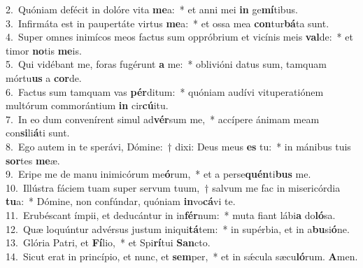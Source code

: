 {2.~}Quóniam defécit in dolóre vita \textbf{me}a:~* et anni mei \textbf{in} ge\textbf{mí}tibus.\\
{3.~}Infirmáta est in paupertáte virtus \textbf{me}a:~* et ossa mea \textbf{con}tur\textbf{bá}ta sunt.\\
{4.~}Super omnes inimícos meos factus sum oppróbrium et vicínis meis \textbf{val}de:~* et timor \textbf{no}tis \textbf{me}is.\\
{5.~}Qui vidébant me, foras fugérunt \textbf{a} me:~* oblivióni datus sum, tamquam mórtu\textbf{us} a \textbf{cor}de.\\
{6.~}Factus sum tamquam vas \textbf{pér}ditum:~* quóniam audívi vituperatiónem multórum commorántium \textbf{in} cir\textbf{cú}itu.\\
{7.~}In eo dum convenírent simul ad\textbf{vér}sum me,~* accípere ánimam meam con\textbf{si}li\textbf{á}ti sunt.\\
{8.~}Ego autem in te sperávi, Dómine:~† dixi: Deus meus \textbf{es} tu:~* in mánibus tuis \textbf{sor}tes \textbf{me}æ.\\
{9.~}Eripe me de manu inimicórum me\textbf{ó}rum,~* et a perse\textbf{quén}ti\textbf{bus} me.\\
{10.~}Illústra fáciem tuam super servum tuum,~† salvum me fac in misericórdia \textbf{tu}a:~* Dómine, non confúndar, quóniam \textbf{in}vo\textbf{cá}vi te.\\
{11.~}Erubéscant ímpii, et deducántur in in\textbf{fér}num:~* muta fiant lábi\textbf{a} do\textbf{ló}sa.\\
{12.~}Quæ loquúntur advérsus justum iniqui\textbf{tá}tem:~* in supérbia, et in a\textbf{bu}si\textbf{ó}ne.\\
{13.~}Glória Patri, et \textbf{Fí}lio,~* et Spi\textbf{rí}tui \textbf{San}cto.\\
{14.~}Sicut erat in princípio, et nunc, et \textbf{sem}per,~* et in sǽcula sæcu\textbf{ló}rum. \textbf{A}men.\\

